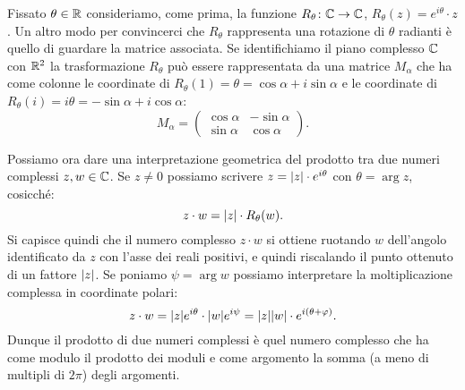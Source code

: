 \begin{remark}
Fissato $\theta\in \mathbb R$
consideriamo, come prima, la funzione $R_\theta\colon \mathbb C \to \mathbb C$,
$R_\theta(z) = e^{i\theta}\cdot z$.
Un altro modo per convincerci che $R_\theta$
rappresenta una rotazione di $\theta$ radianti è
quello di guardare la matrice associata.
Se identifichiamo il piano complesso $\mathbb C$ con $\mathbb R^2$ la trasformazione
$R_\theta$ può essere rappresentata
da una matrice $M_\alpha$ che ha come
colonne le coordinate di $R_\theta(1) = \theta = \cos \alpha + i \sin \alpha$
e le coordinate di $R_\theta(i) = i\theta = -\sin \alpha + i \cos \alpha$:
\[
  M_\alpha =
  \begin{pmatrix}
  \cos \alpha & -\sin \alpha \\
  \sin \alpha & \cos \alpha
  \end{pmatrix}.
\]
\end{remark}

\begin{remark}
Possiamo ora dare una interpretazione geometrica del prodotto tra
due numeri complessi $z,w\in \mathbb C$.
Se $z\neq 0$ possiamo scrivere $z = {\left|z\right|} \cdot e^{i\theta}$
con $\theta= \arg z$, cosicché:
\[
  z \cdot w = {\left|z\right|} \cdot R_\theta(w).
\]
Si capisce quindi che il numero complesso $z\cdot w$ si ottiene ruotando
$w$ dell'angolo identificato da $z$ con l'asse dei reali positivi, e quindi
riscalando il punto ottenuto di un fattore ${\left|z\right|}$.
Se poniamo $\psi = \arg w$ possiamo interpretare la moltiplicazione complessa
in coordinate polari:
\[
  z \cdot w = {\left|z\right|}e^{i\theta}\cdot {\left|w\right|} e^{i\psi}
   = {\left|z\right|} {\left|w\right|} \cdot e^{i(\theta + \varphi)}.
\]
Dunque il prodotto di due numeri complessi è quel numero complesso
che ha come modulo il prodotto dei moduli e come argomento
la somma (a meno di multipli di $2\pi$) degli argomenti.
\end{remark}


